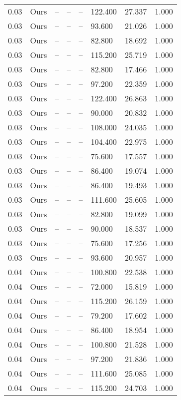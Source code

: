 \begin{table}[H]
\begin{tabular}{l c l l l}
0.03 & Ours & -- & -- & -- & 122.400 & 27.337 & 1.000 \\
0.03 & Ours & -- & -- & -- & 93.600 & 21.026 & 1.000 \\
0.03 & Ours & -- & -- & -- & 82.800 & 18.692 & 1.000 \\
0.03 & Ours & -- & -- & -- & 115.200 & 25.719 & 1.000 \\
0.03 & Ours & -- & -- & -- & 82.800 & 17.466 & 1.000 \\
0.03 & Ours & -- & -- & -- & 97.200 & 22.359 & 1.000 \\
0.03 & Ours & -- & -- & -- & 122.400 & 26.863 & 1.000 \\
0.03 & Ours & -- & -- & -- & 90.000 & 20.832 & 1.000 \\
0.03 & Ours & -- & -- & -- & 108.000 & 24.035 & 1.000 \\
0.03 & Ours & -- & -- & -- & 104.400 & 22.975 & 1.000 \\
0.03 & Ours & -- & -- & -- & 75.600 & 17.557 & 1.000 \\
0.03 & Ours & -- & -- & -- & 86.400 & 19.074 & 1.000 \\
0.03 & Ours & -- & -- & -- & 86.400 & 19.493 & 1.000 \\
0.03 & Ours & -- & -- & -- & 111.600 & 25.605 & 1.000 \\
0.03 & Ours & -- & -- & -- & 82.800 & 19.099 & 1.000 \\
0.03 & Ours & -- & -- & -- & 90.000 & 18.537 & 1.000 \\
0.03 & Ours & -- & -- & -- & 75.600 & 17.256 & 1.000 \\
0.03 & Ours & -- & -- & -- & 93.600 & 20.957 & 1.000 \\
0.04 & Ours & -- & -- & -- & 100.800 & 22.538 & 1.000 \\
0.04 & Ours & -- & -- & -- & 72.000 & 15.819 & 1.000 \\
0.04 & Ours & -- & -- & -- & 115.200 & 26.159 & 1.000 \\
0.04 & Ours & -- & -- & -- & 79.200 & 17.602 & 1.000 \\
0.04 & Ours & -- & -- & -- & 86.400 & 18.954 & 1.000 \\
0.04 & Ours & -- & -- & -- & 100.800 & 21.528 & 1.000 \\
0.04 & Ours & -- & -- & -- & 97.200 & 21.836 & 1.000 \\
0.04 & Ours & -- & -- & -- & 111.600 & 25.085 & 1.000 \\
0.04 & Ours & -- & -- & -- & 115.200 & 24.703 & 1.000 \\

\end{tabular}
\end{table}

